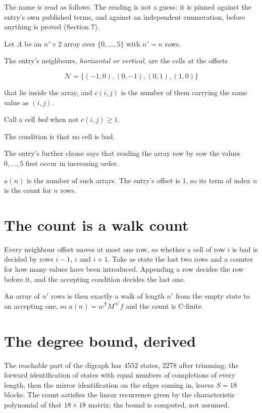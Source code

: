 \documentclass[11pt]{article}
\theoremstyle{definition}
\begin{document}
The name is read as follows. The reading is not a guess: it is pinned against the entry's own published terms, and against an independent enumeration, before anything is proved (Section 7).

Let $A$ be an $n' \times 2$ array over $\{0,\dots,5\}$ with $n' = n$ rows.

The entry's neighbours, {\itshape horizontal or vertical}, are the cells at the offsets

\[\mathcal{N} = \{(-1,0), (0,-1), (0,1), (1,0)\}\]

that lie inside the array, and $c(i,j)$ is the number of them carrying the same value as $(i,j)$.

Call a cell {\itshape bad} when not $c(i,j) \ge 1$.

The condition is that no cell is bad.

The entry's further clause says that reading the array row by row the values $0,\dots,5$ first occur in increasing order.

$a(n)$ is the number of such arrays. The entry's offset is 1, so its term of index $n$ is the count for $n$ rows.

\section{The count is a walk count}

Every neighbour offset moves at most one row, so whether a cell of row $i$ is bad is decided by rows $i-1$, $i$ and $i+1$. Take as state the last two rows and a counter for how many values have been introduced. Appending a row decides the row before it, and the accepting condition decides the last one.

An array of $n'$ rows is then exactly a walk of length $n'$ from the empty state to an accepting one, so $a(n) = w^{\mathsf T}M^{\,n'}f$ and the count is C-finite.

\section{The degree bound, derived}

The reachable part of the digraph has $4552$ states, $2278$ after trimming; the forward identification of states with equal numbers of completions of every length, then the mirror identification on the edges coming in, leaves $S = 18$ blocks. The count satisfies the linear recurrence given by the characteristic polynomial of that $18\times18$ matrix; the bound is computed, not assumed.
\end{document}

